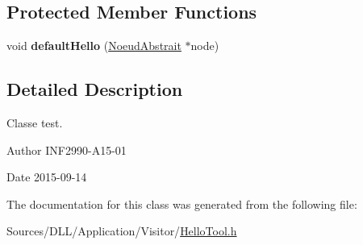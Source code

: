 \subsection*{Protected Member Functions}
\begin{DoxyCompactItemize}
\item 
\hypertarget{class_hello_tool_a78dcb5d555bac0cd9f87ac8ade27e711}{}void {\bfseries default\+Hello} (\hyperlink{class_noeud_abstrait}{Noeud\+Abstrait} $\ast$node)\label{class_hello_tool_a78dcb5d555bac0cd9f87ac8ade27e711}

\end{DoxyCompactItemize}


\subsection{Detailed Description}
Classe test. 

\begin{DoxyAuthor}{Author}
I\+N\+F2990-\/\+A15-\/01 
\end{DoxyAuthor}
\begin{DoxyDate}{Date}
2015-\/09-\/14 
\end{DoxyDate}


The documentation for this class was generated from the following file\+:\begin{DoxyCompactItemize}
\item 
Sources/\+D\+L\+L/\+Application/\+Visitor/\hyperlink{_hello_tool_8h}{Hello\+Tool.\+h}\end{DoxyCompactItemize}
